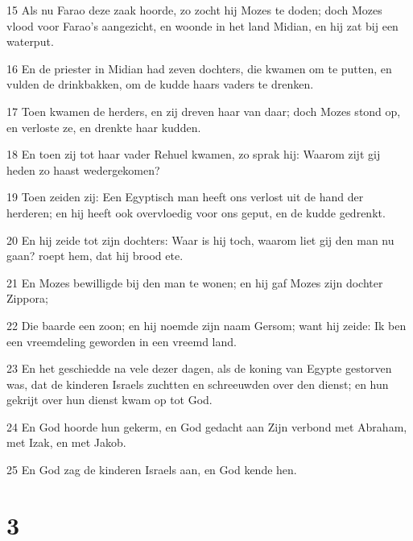 \par 15 Als nu Farao deze zaak hoorde, zo zocht hij Mozes te doden; doch Mozes vlood voor Farao's aangezicht, en woonde in het land Midian, en hij zat bij een waterput.
\par 16 En de priester in Midian had zeven dochters, die kwamen om te putten, en vulden de drinkbakken, om de kudde haars vaders te drenken.
\par 17 Toen kwamen de herders, en zij dreven haar van daar; doch Mozes stond op, en verloste ze, en drenkte haar kudden.
\par 18 En toen zij tot haar vader Rehuel kwamen, zo sprak hij: Waarom zijt gij heden zo haast wedergekomen?
\par 19 Toen zeiden zij: Een Egyptisch man heeft ons verlost uit de hand der herderen; en hij heeft ook overvloedig voor ons geput, en de kudde gedrenkt.
\par 20 En hij zeide tot zijn dochters: Waar is hij toch, waarom liet gij den man nu gaan? roept hem, dat hij brood ete.
\par 21 En Mozes bewilligde bij den man te wonen; en hij gaf Mozes zijn dochter Zippora;
\par 22 Die baarde een zoon; en hij noemde zijn naam Gersom; want hij zeide: Ik ben een vreemdeling geworden in een vreemd land.
\par 23 En het geschiedde na vele dezer dagen, als de koning van Egypte gestorven was, dat de kinderen Israels zuchtten en schreeuwden over den dienst; en hun gekrijt over hun dienst kwam op tot God.
\par 24 En God hoorde hun gekerm, en God gedacht aan Zijn verbond met Abraham, met Izak, en met Jakob.
\par 25 En God zag de kinderen Israels aan, en God kende hen.

\chapter{3}

